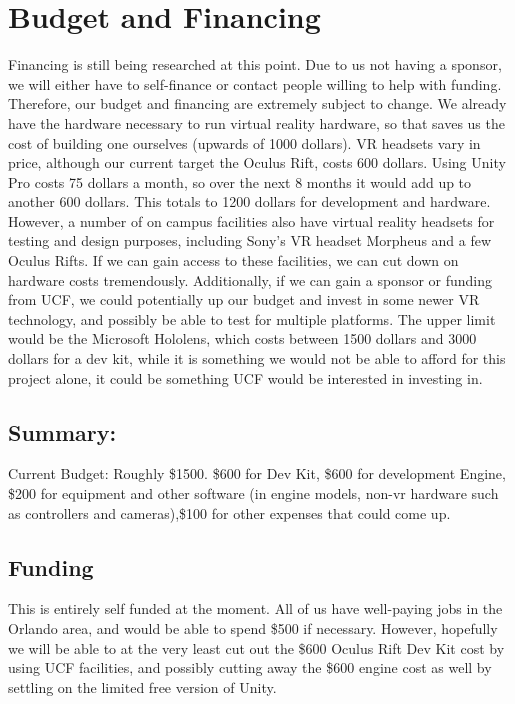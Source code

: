 \documentclass[a4paper,10pt]{article}
\begin{document}
\section{Budget and Financing}
	                    Financing is still being researched at this point.  Due to us not having a sponsor, we will either have to self-finance or contact people willing to help with funding.  Therefore, our budget and financing are extremely subject to change. We already have the hardware necessary to run virtual reality hardware, so that saves us the cost of building one ourselves (upwards of 1000 dollars). VR headsets vary in price, although our current target the Oculus Rift, costs 600 dollars. Using Unity Pro costs 75 dollars a month, so over the next 8 months it would add up to another 600 dollars. This totals to 1200 dollars for development and hardware. However, a number of on campus facilities also have virtual 
	                    reality headsets for testing and design purposes, including Sony’s VR headset Morpheus and a few Oculus Rifts.  If we can gain access to these facilities, we can cut down on hardware costs tremendously.  Additionally, if we can gain a sponsor or funding from UCF, we could potentially up our budget and invest in some newer VR 
	                    technology, and possibly be able to test for multiple platforms. The upper limit would be the Microsoft Hololens, which costs between 1500 dollars and 3000 dollars for a dev kit, while it is something we would 
	                    not be able to afford for this project alone, it could be something UCF would be interested in investing in.  
	                    
	                    \subsection{Summary:}
	                    Current Budget: Roughly \$1500.  \$600 for Dev Kit,
	                    \$600 for development Engine, \$200 for equipment and other software (in engine models, non-vr hardware such as controllers and cameras),\$100 for other
	                    expenses that could come up.
	                    
	                    \subsection{Funding}
	                    This is entirely self funded at the moment.  All of us have well-paying jobs in the 
	                    Orlando area, and would be able to spend \$500 if necessary.  However, hopefully we will be able to at the very least cut out the 
	                    \$600 Oculus Rift Dev Kit cost by using UCF facilities, and possibly cutting away the \$600 engine cost as well by settling on the limited free version of Unity.  
\end{document}
